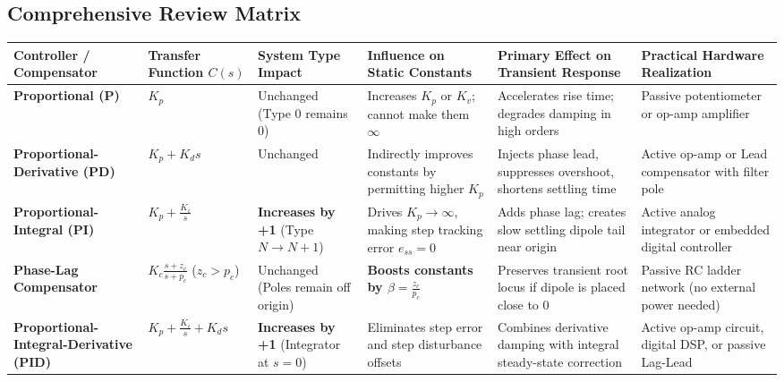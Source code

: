 \documentclass[12pt,onecolumn,twoside ]{article}
\begin{document}
	\subsection{Comprehensive Review Matrix}
	\begin{center}\small\begin{tabularx}{\textwidth}{*{6}{Y}}
			\toprule
			\textbf{Controller / Compensator} & \textbf{Transfer Function $C(s)$} & \textbf{System Type Impact} & \textbf{Influence on Static Constants} & \textbf{Primary Effect on Transient Response} & \textbf{Practical Hardware Realization} \\
			\midrule
			\textbf{Proportional (P)} & $K_p$ & Unchanged (Type 0 remains 0) & Increases $K_p$ or $K_v$; cannot make them $\infty$ & Accelerates rise time; degrades damping in high orders & Passive potentiometer or op-amp amplifier \\
			\textbf{Proportional-Derivative (PD)} & $K_p + K_d s$ & Unchanged & Indirectly improves constants by permitting higher $K_p$ & Injects phase lead, suppresses overshoot, shortens settling time & Active op-amp or Lead compensator with filter pole \\
			\textbf{Proportional-Integral (PI)} & $K_p + \frac{K_i}{s}$ & \textbf{Increases by +1} (Type $N \to N+1$) & Drives $K_p \to \infty$, making step tracking error $e_{ss} = 0$ & Adds phase lag; creates slow settling dipole tail near origin & Active analog integrator or embedded digital controller \\
			\textbf{Phase-Lag Compensator} & $K_c \frac{s + z_c}{s + p_c}$ ($z_c > p_c$) & Unchanged (Poles remain off origin) & \textbf{Boosts constants by $\beta = \frac{z_c}{p_c}$} & Preserves transient root locus if dipole is placed close to $0$ & Passive RC ladder network (no external power needed) \\
			\textbf{Proportional-Integral-Derivative (PID)} & $K_p + \frac{K_i}{s} + K_d s$ & \textbf{Increases by +1} (Integrator at $s = 0$) & Eliminates step error and step disturbance offsets & Combines derivative damping with integral steady-state correction & Active op-amp circuit, digital DSP, or passive Lag-Lead \\
			\bottomrule
	\end{tabularx}\end{center}
	
\end{document}
